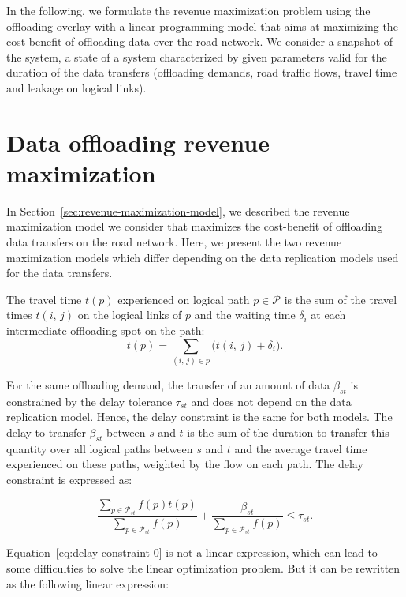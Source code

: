 In the following, we formulate the revenue maximization problem using the offloading overlay with a linear programming model that aims at maximizing the cost-benefit of offloading data over the road network. We consider a snapshot of the system, \ie a state of a system characterized by given parameters valid for the duration of the data transfers (offloading demands, road traffic flows, travel time and  leakage on logical links).

\section{Data offloading revenue maximization}
\label{sec:revenue-maximization}

In Section~\ref{sec:revenue-maximization-model}, we described the revenue maximization model we consider that maximizes the cost-benefit of offloading data transfers on the road network. Here, we present the two revenue maximization models which differ depending on the data replication models used for the data transfers.

The travel time $t(p)$ experienced on logical path $p\in \mathcal{P}$ is the sum of the travel times $t(i,\,j)$ on the logical links of $p$ and the waiting time $\delta_{i}$ at each intermediate offloading spot on the path:
\begin{equation}
    t(p) = \sum_{(i,\,j)\in p} \big(t(i,\,j) + \delta_{i}\big).
    \label{eq:feas-logical-path-travel-time}
\end{equation}

For the same offloading demand, the transfer of an amount of data $\beta_{st}$ is constrained by the delay tolerance $\tau_{st}$ and does not depend on the data replication model. Hence, the delay constraint is the same for both models. The delay to transfer $\beta_{st}$ between $s$ and $t$ is the sum of the duration to transfer this quantity over all logical paths between $s$ and $t$ and the average travel time experienced on these paths, weighted by the flow on each path. The delay constraint is expressed as:

\begin{equation}
    \frac{\sum_{p\in \mathcal{P}_{st}}f(p)t(p)}{\sum_{p\in \mathcal{P}_{st}}f(p)} + \frac{\beta_{st}}{\sum_{p\in \mathcal{P}_{st}}f(p)} \leq \tau_{st}.
    \label{eq:delay-constraint-0}
\end{equation}

Equation~\ref{eq:delay-constraint-0} is not a linear expression, which can lead to some difficulties to solve the linear optimization problem. But it can be rewritten as the following linear expression:

